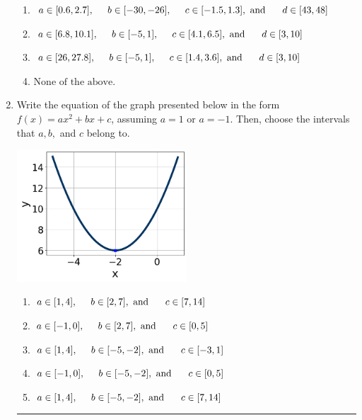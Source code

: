 \documentclass[14pt]{extbook}
\newcommand{\litem}[1]{\item#1\hspace*{-1cm}\rule{\textwidth}{0.4pt}}
\begin{document}
\begin{enumerate}
{\begin{enumerate}[label=\Alph*.]
\item \( a \in [0.6, 2.7], \hspace*{5mm} b \in [-30, -26], \hspace*{5mm} c \in [-1.5, 1.3], \text{ and } \hspace*{5mm} d \in [43, 48] \)
\item \( a \in [6.8, 10.1], \hspace*{5mm} b \in [-5, 1], \hspace*{5mm} c \in [4.1, 6.5], \text{ and } \hspace*{5mm} d \in [3, 10] \)
\item \( a \in [26, 27.8], \hspace*{5mm} b \in [-5, 1], \hspace*{5mm} c \in [1.4, 3.6], \text{ and } \hspace*{5mm} d \in [3, 10] \)
\item \( \text{None of the above.} \)

\end{enumerate} }
\litem{
Write the equation of the graph presented below in the form $f(x)=ax^2+bx+c$, assuming  $a=1$ or $a=-1$. Then, choose the intervals that $a, b,$ and $c$ belong to.
\begin{center}
    \includegraphics[width=0.5\textwidth]{../Figures/quadraticGraphToEquationCopyB.png}
\end{center}
\begin{enumerate}[label=\Alph*.]
\item \( a \in [1, 4], \hspace*{5mm} b \in [2, 7], \text{ and } \hspace*{5mm} c \in [7, 14] \)
\item \( a \in [-1, 0], \hspace*{5mm} b \in [2, 7], \text{ and } \hspace*{5mm} c \in [0, 5] \)
\item \( a \in [1, 4], \hspace*{5mm} b \in [-5, -2], \text{ and } \hspace*{5mm} c \in [-3, 1] \)
\item \( a \in [-1, 0], \hspace*{5mm} b \in [-5, -2], \text{ and } \hspace*{5mm} c \in [0, 5] \)
\item \( a \in [1, 4], \hspace*{5mm} b \in [-5, -2], \text{ and } \hspace*{5mm} c \in [7, 14] \)


\end{enumerate}}
\end{enumerate}
\end{document}
